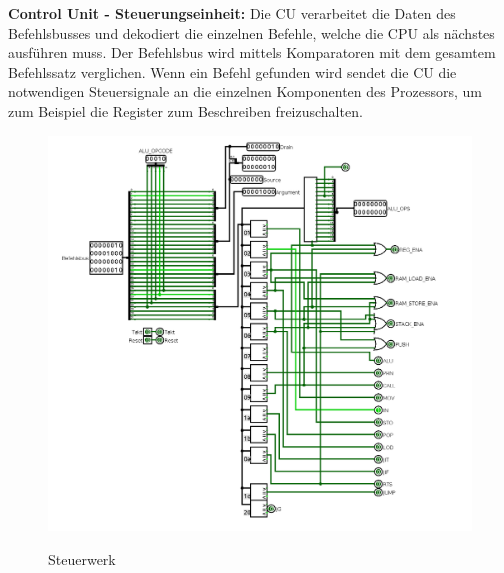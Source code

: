 \documentclass[12pt]{article}
\begin{document}
\textbf{Control Unit - Steuerungseinheit: } Die CU verarbeitet die Daten des Befehlsbusses und dekodiert die einzelnen Befehle, welche die CPU als nächstes ausführen muss. Der Befehlsbus wird mittels Komparatoren mit dem gesamtem Befehlssatz verglichen. Wenn ein Befehl gefunden wird sendet die CU die notwendigen Steuersignale an die einzelnen Komponenten des Prozessors, um zum Beispiel die Register zum Beschreiben freizuschalten.


\begin{figure}[!htbp]
\includegraphics[scale=0.35]{cu}
\centering
\label{fig:cu}
\caption{Steuerwerk}
\end{figure}
\newpage
\newpage
\end{document}
